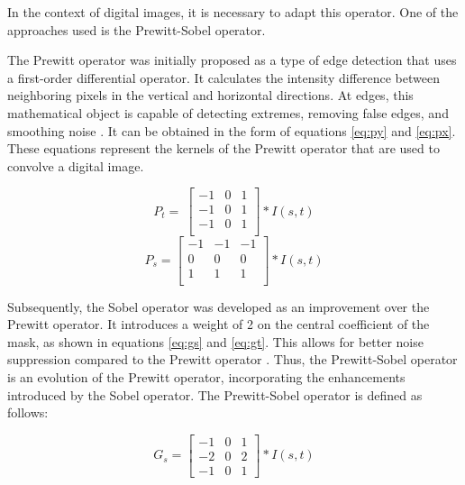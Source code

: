 In the context of digital images, it is necessary to adapt this operator. One of the approaches used is the Prewitt-Sobel operator.

The Prewitt operator was initially proposed as a type of edge detection that uses a first-order differential operator. It calculates the intensity difference between neighboring pixels in the vertical and horizontal directions. At edges, this mathematical object is capable of detecting extremes, removing false edges, and smoothing noise \cite{Zhang2020, prewitt1970object}. It can be obtained in the form of equations \eqref{eq:py} and \eqref{eq:px}. These equations represent the kernels of the Prewitt operator that are used to convolve a digital image.

\begin{equation}
    P_t= \
\begin{bmatrix}
-1 & 0 & 1 \\
-1 & 0 & 1 \\
-1 & 0 & 1 \\
\end{bmatrix} 
* I(s, t)
\label{eq:py}
\end{equation}
\begin{equation}
    P_s = 
\begin{bmatrix}
-1 & -1 & -1 \\
0 & 0 & 0 \\
1 & 1 & 1 \\
\end{bmatrix}
 * I(s, t)
\label{eq:px}
\end{equation}

Subsequently, the Sobel operator was developed as an improvement over the Prewitt operator. It introduces a weight of 2 on the central coefficient of the mask, as shown in equations \eqref{eq:gs} and \eqref{eq:gt}. This allows for better noise suppression compared to the Prewitt operator \cite{Zhang2020}. Thus, the Prewitt-Sobel operator is an evolution of the Prewitt operator, incorporating the enhancements introduced by the Sobel operator. The Prewitt-Sobel operator is defined as follows:

\begin{equation}
G_s = \begin{bmatrix}
-1 & 0 & 1 \\
-2 & 0 & 2 \\
-1 & 0 & 1
\end{bmatrix} * I(s, t)
\label{eq:gs}
\end{equation}

